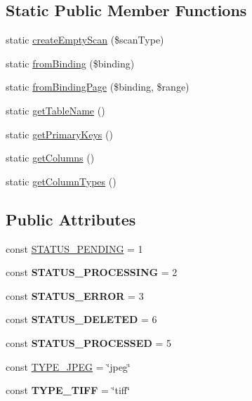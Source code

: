 \subsection*{Static Public Member Functions}
\begin{DoxyCompactItemize}
\item 
static \hyperlink{classScan_a72b5430d02418d3172fce94f5dac3535}{createEmptyScan} (\$scanType)
\item 
static \hyperlink{classScan_abc15811492a84be59c482e562a73cd22}{fromBinding} (\$binding)
\item 
static \hyperlink{classScan_a6b5542f995d5f444adb53595972261fa}{fromBindingPage} (\$binding, \$range)
\item 
static \hyperlink{classScan_ad9ada4df484a671439f131458e22d2e0}{getTableName} ()
\item 
static \hyperlink{classScan_a0e7fe3c9a64e4655114a82473fc78827}{getPrimaryKeys} ()
\item 
static \hyperlink{classScan_a51a201a61df50b19fd6a7b96d7521ca5}{getColumns} ()
\item 
static \hyperlink{classScan_a9ae3218caa7bc866a8b914eab7b649a2}{getColumnTypes} ()
\end{DoxyCompactItemize}
\subsection*{Public Attributes}
\begin{DoxyCompactItemize}
\item 
const \hyperlink{classScan_a0a517a759400b21e5814247523d527de}{STATUS\_\-PENDING} = 1
\item 
\hypertarget{classScan_a059685b613793482fb87ca51bc0f0f60}{
const {\bfseries STATUS\_\-PROCESSING} = 2}
\label{classScan_a059685b613793482fb87ca51bc0f0f60}

\item 
\hypertarget{classScan_ab700b9c448f22eef759ab6eaed56e8ef}{
const {\bfseries STATUS\_\-ERROR} = 3}
\label{classScan_ab700b9c448f22eef759ab6eaed56e8ef}

\item 
\hypertarget{classScan_a508096fc915de5d0761c08be5bd7baef}{
const {\bfseries STATUS\_\-DELETED} = 6}
\label{classScan_a508096fc915de5d0761c08be5bd7baef}

\item 
\hypertarget{classScan_a1075afe3fb397fba5f84c2c8f2e5bb26}{
const {\bfseries STATUS\_\-PROCESSED} = 5}
\label{classScan_a1075afe3fb397fba5f84c2c8f2e5bb26}

\item 
const \hyperlink{classScan_a9837751227b9fa341e447d81e9f6057f}{TYPE\_\-JPEG} = \char`\"{}jpeg\char`\"{}
\item 
\hypertarget{classScan_a9ed06069bb19f356204285181db1b6e4}{
const {\bfseries TYPE\_\-TIFF} = \char`\"{}tiff\char`\"{}}
\label{classScan_a9ed06069bb19f356204285181db1b6e4}

\end{DoxyCompactItemize}
